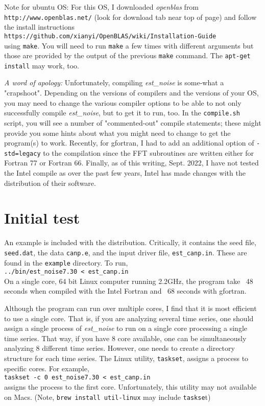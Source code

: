 \documentclass[12pt]{amsart}
\begin{document}
Note for ubuntu OS:  For this OS, I downloaded \textit{openblas} from 
\\
\texttt{http://www.openblas.net/} (look for download tab near top
of page) and follow the install instructions 
\\
\texttt{https://github.com/xianyi/OpenBLAS/wiki/Installation-Guide}
\\
using \texttt{make}.
You will need to run \texttt{make} a few times with different arguments but those are provided by the output of the previous \texttt{make} command.  The \texttt{apt-get install} may work, too.

\textit{A word of apology:}  Unfortunately, compiling \textit{est\_noise} is some-what a "crapshoot".  Depending on the
versions of compilers and the versions of your OS, you may need to change the various compiler options to be able
to not only successfully compile \textit{est\_noise}, but to get it to run, too. In the \texttt{compile.sh} script, you will
see a number of "commented-out" compile statements; these might provide you some hints about what you might
need to change to get the program(s) to work. Recently, for gfortran, I had to add an additional option of \texttt{-std=legacy}
to the compilation since the FFT subroutines are written either for Fortran 77 or Fortran 66. Finally, as of this writing, Sept. 2022, 
I have not tested the Intel compile as over the past few years, Intel has made changes with the distribution of their software.

\section{Initial test}

An example is included with the distribution. Critically, it contains the seed file, \texttt{seed.dat}, the data \texttt{canp.e}, and the
input driver file, \texttt{est\_canp.in}. These are found in the \texttt{example} directory. To run,
\\
\texttt{../bin/est\_noise7.30 < est\_canp.in} \\
On a single core, 64 bit Linux computer running 2.2GHz, the program take ~48 seconds when compiled with the Intel Fortran and ~68 seconds with gfortran.

Although the program can run over multiple cores, I find that it is most efficient to use a single core.  That is, if you are 
analyzing several time series, one should assign a single process of \textit{est\_noise} to run on a single core processing
a single time series. That way, if you have 8 core available, one can be simultaneously analyzing 8 different time series. However, one needs to
create a directory structure for each time series. The Linux utility, \texttt{taskset}, assigns a process to specific cores. For example,
\\
\texttt{taskset -c 0 est\_noise7.30 < est\_canp.in}\\
assigns the process to the first core.  Unfortunately, this utility may not available on Macs. (Note,  \texttt{brew install util-linux} may
include \texttt{taskse}t)
\end{document}
